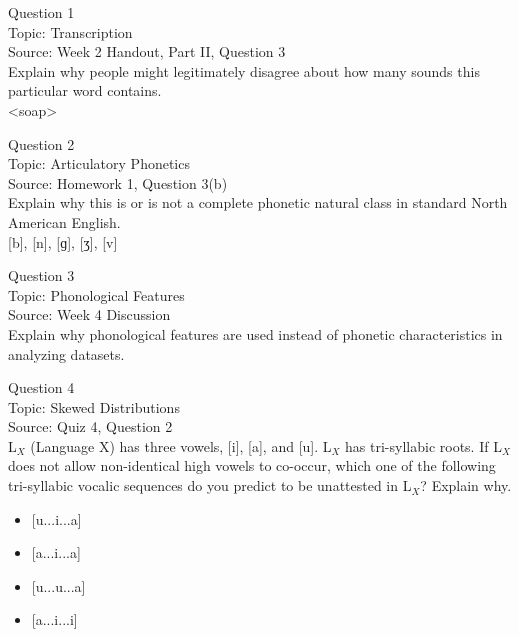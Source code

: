 \documentclass[12pt]{article}
\begin{document}
{\large Question 1}\\

Topic: Transcription\\
Source: Week 2 Handout, Part II, Question 3\\

Explain why people might legitimately disagree about how many sounds this particular word contains.\\

<soap>


\newpage

{\large Question 2}\\

Topic: Articulatory Phonetics\\
Source: Homework 1, Question 3(b)\\

Explain why this is or is not a complete phonetic natural class in standard North American English.\\

{[b]}, {[n]}, {[ɡ]}, {[ʒ]}, {[v]}


\newpage

{\large Question 3}\\

Topic: Phonological Features\\
Source: Week 4 Discussion\\

Explain why phonological features are used instead of phonetic characteristics in analyzing datasets.\\


\newpage

{\large Question 4}\\

Topic: Skewed Distributions\\
Source: Quiz 4, Question 2\\

L$_X$ (Language X) has three vowels, [i], [a], and [u]. L$_X$ has tri-syllabic roots. If L$_X$ does not allow non-identical high vowels to co-occur, which one of the following tri-syllabic vocalic sequences do you predict to be unattested in L$_X$? Explain why.\\

\begin{itemize} \item {[u...i...a]} \item {[a...i...a]} \item {[u...u...a]} \item {[a...i...i]} \end{itemize}
\end{document}
